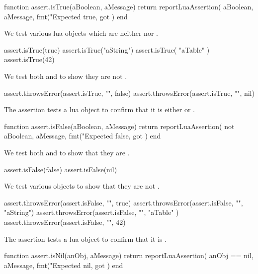 \startLuaCode
function assert.isTrue(aBoolean, aMessage)
  return reportLuaAssertion(
    aBoolean,
    aMessage,
    fmt("Expected true, got %
  )
end
\stopLuaCode


We test various lua objects which are neither  nor . 

\startLuaTest
  assert.isTrue(true)
  assert.isTrue("aString")
  assert.isTrue({ "aTable" })
  assert.isTrue(42)
\stopLuaTest
\stopTestCase


We test both  and  to show they are not 
. 

\startLuaTest
  assert.throwsError(assert.isTrue, "", false)
  assert.throwsError(assert.isTrue, "", nil)
\stopLuaTest
\stopTestCase

\stopTestSuite


The  assertion tests a lua object to confirm that it 
is either  or . 

\startLuaCode
function assert.isFalse(aBoolean, aMessage)
  return reportLuaAssertion(
    not aBoolean,
    aMessage,
    fmt("Expected false, got %
  )
end
\stopLuaCode


We test both  and  to show that they are 
. 

\startLuaTest
  assert.isFalse(false)
  assert.isFalse(nil)
\stopLuaTest
\stopTestCase


We test various objects to show that they are not .

\startLuaTest
  assert.throwsError(assert.isFalse, "", true)
  assert.throwsError(assert.isFalse, "", "aString")
  assert.throwsError(assert.isFalse, "", { "aTable" })
  assert.throwsError(assert.isFalse, "", 42)
\stopLuaTest
\stopTestCase

\stopTestSuite


The  assertion tests a lua object to confirm that it is 
. 

\startLuaCode
function assert.isNil(anObj, aMessage)
  return reportLuaAssertion(
    anObj == nil,
    aMessage,
    fmt("Expected nil, got %
  )
end
\stopLuaCode

